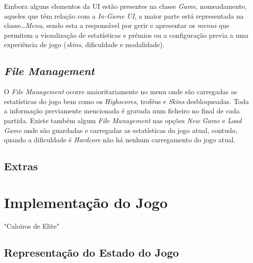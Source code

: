 \documentclass[a4paper,11pt]{article}
\newcommand\tab[1][0.8cm]{\hspace*{#1}}
\begin{document}
\vspace{8pt}

Embora alguns elementos da UI estão presentes na classe \textit{Game}, nomeadamente, aqueles que têm relação com a \textit{In-Game UI}, a maior parte está representada na classe\dots \textit{Menu}, sendo esta a responsável por gerir e apresentar os \textit{menus} que permitem a visualização de estatísticas e prémios ou a configuração previa a uma experiência de jogo (\textit{skins}, dificuldade e modalidade).


\vspace{8pt}

\subsection*{\textit{File Management}}
O \textit{File Management} ocorre maioritariamente no menu onde são carregadas as estatísticas do jogo bem como os \textit{Highscores}, troféus e \textit{Skins} desbloqueadas. Toda a informação previamente mencionada é gravada num ficheiro no final de cada partida. Existe também algum \textit{File Management} nas opções \textit{New Game} e \textit{Load Game} onde são guardadas e carregadas as estatísticas do jogo atual, contudo, quando a dificuldade é \textit{Hardcore} não há nenhum carregamento do jogo atual.


\vspace{8pt}

\subsection*{Extras}

\vspace{8pt}


\pagebreak

\section{Implementação do Jogo}

\vspace{8pt}

\tab

"Caloiros de Elite" 

\vspace{8pt}

\subsection{Representação do Estado do Jogo}
\pagebreak
\end{document}
